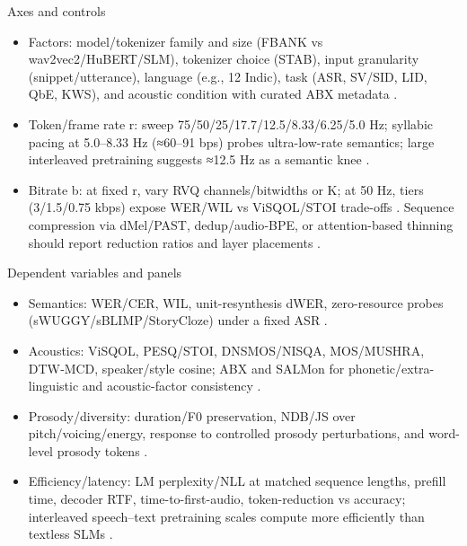 Axes and controls
\begin{itemize}
  \item Factors: model/tokenizer family and size (FBANK vs wav2vec2/HuBERT/SLM), tokenizer choice (STAB), input granularity (snippet/utterance), language (e.g., 12 Indic), task (ASR, SV/SID, LID, QbE, KWS), and acoustic condition with curated ABX metadata \cite{poli2025fastabxlibraryefficientcomputationabxdis,vashishth2024stabspeechtokenizerassessmentbenchmark,fily2024establishingdegreesclosenessbetweenaudio,entry2025indicsuperbspeechprocessinguniversalperf,tian2025espnetspeechlmopenspeechlanguagemodeltoo}.
  \item Token/frame rate r: sweep 75/50/25/17.7/12.5/8.33/6.25/5.0 Hz; syllabic pacing at 5.0–8.33 Hz (≈60–91 bps) probes ultra-low-rate semantics; large interleaved pretraining suggests ≈12.5 Hz as a semantic knee \cite{baade2024syllablelmlearningcoarsesemanticunitsspe,zeng2024scalingspeechtextpretrainingsyntheticint}.
  \item Bitrate b: at fixed r, vary RVQ channels/bitwidths or K; at 50 Hz, tiers (3/1.5/0.75 kbps) expose WER/WIL vs ViSQOL/STOI trade-offs \cite{li2024investigatingneuralaudiocodecsspeechlang,ahasan2025dmcodecdistillingmultimodalrepresentatio}. Sequence compression via dMel/PAST, dedup/audio‑BPE, or attention-based thinning should report reduction ratios and layer placements \cite{bai2025dmelspeechtokenizationmadesimple,har-tuv2025pastphoneticacousticspeechtokenizer,min2025speechretrievalaugmentedgenerationwithou}.
\end{itemize}

Dependent variables and panels
\begin{itemize}
  \item Semantics: WER/CER, WIL, unit-resynthesis dWER, zero-resource probes (sWUGGY/sBLIMP/StoryCloze) under a fixed ASR \cite{li2024investigatingneuralaudiocodecsspeechlang}.
  \item Acoustics: ViSQOL, PESQ/STOI, DNSMOS/NISQA, MOS/MUSHRA, DTW‑MCD, speaker/style cosine; ABX and SALMon for phonetic/extra-linguistic and acoustic-factor consistency \cite{fily2024establishingdegreesclosenessbetweenaudio,maimon2025salmonsuiteacousticlanguagemodelevaluati,poli2025fastabxlibraryefficientcomputationabxdis}.
  \item Prosody/diversity: duration/F0 preservation, NDB/JS over pitch/voicing/energy, response to controlled prosody perturbations, and word-level prosody tokens \cite{qian2025prosodylmuncoveringemergingprosodyproces,onda2025benchmarkingprosodyencodingdiscretespeec}.
  \item Efficiency/latency: LM perplexity/NLL at matched sequence lengths, prefill time, decoder RTF, time-to-first-audio, token-reduction vs accuracy; interleaved speech–text pretraining scales compute more efficiently than textless SLMs \cite{maimon2025scalinganalysisinterleavedspeechtextlang,ma2025efficientspeechlanguagemodelingenergydis,vashishth2024stabspeechtokenizerassessmentbenchmark}.
\end{itemize}


